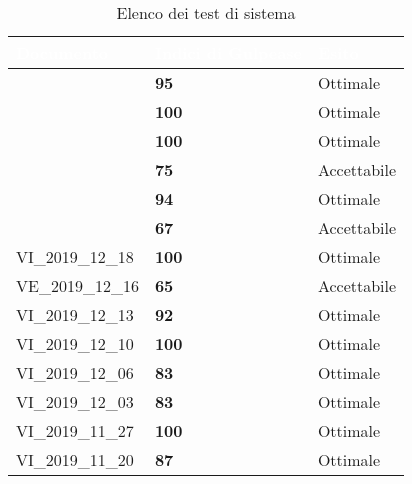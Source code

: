{
\renewcommand{\arraystretch}{1.5}
\centering
\begin{longtable}{ C{4cm} C{4cm} C{4cm} }
\caption{Elenco dei test di sistema}\\
\textcolor{white}{\textbf{Documento}} & \textcolor{white}{\textbf{Indici di Gulpease}} & \textcolor{white}{\textbf{Esito}} \\
\hline
\endhead
{} & \textcolor{verde}{\textbf{95}} & Ottimale \\
 & \textcolor{verde}{\textbf{100}} & Ottimale \\
 & \textcolor{verde}{\textbf{100}} & Ottimale \\

 & \textcolor{giallo}{\textbf{75}} & Accettabile \\
 & \textcolor{verde}{\textbf{94}} & Ottimale \\

 & \textcolor{giallo}{\textbf{67}} & Accettabile \\

VI\_2019\_12\_18 & \textcolor{verde}{\textbf{100}} & Ottimale \\
VE\_2019\_12\_16 & \textcolor{giallo}{\textbf{65}} & Accettabile \\
VI\_2019\_12\_13 & \textcolor{verde}{\textbf{92}} & Ottimale \\
VI\_2019\_12\_10 & \textcolor{verde}{\textbf{100}} & Ottimale \\
VI\_2019\_12\_06 & \textcolor{verde}{\textbf{83}} & Ottimale \\
VI\_2019\_12\_03 & \textcolor{verde}{\textbf{83}} & Ottimale \\
VI\_2019\_11\_27 & \textcolor{verde}{\textbf{100}} & Ottimale \\
VI\_2019\_11\_20 & \textcolor{verde}{\textbf{87}} & Ottimale \\

\end{longtable}
}
